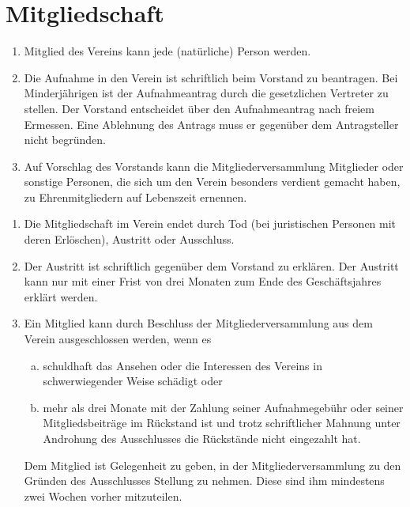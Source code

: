 \documentclass{scrartcl}
\begin{document}
\section{Mitgliedschaft}
\begin{contract}
\begin{enumerate}
    \item Mitglied des Vereins kann jede (natürliche) Person werden.
    \item Die Aufnahme in den Verein ist schriftlich beim Vorstand zu beantragen. Bei Minderjährigen ist der Aufnahmeantrag durch die gesetzlichen Vertreter zu stellen. Der Vorstand entscheidet über den Aufnahmeantrag nach freiem Ermessen. Eine Ablehnung des Antrags muss er gegenüber dem Antragsteller nicht begründen.
    \item Auf Vorschlag des Vorstands kann die Mitgliederversammlung Mitglieder oder sonstige Personen, die sich um den Verein besonders verdient gemacht haben, zu Ehrenmitgliedern auf Lebenszeit ernennen.
\end{enumerate}

\begin{enumerate}
    \item Die Mitgliedschaft im Verein endet durch Tod (bei juristischen Personen mit deren Erlöschen), Austritt oder Ausschluss.
    \item Der Austritt ist schriftlich gegenüber dem Vorstand zu erklären. Der Austritt kann nur mit einer Frist von drei Monaten zum Ende des Geschäftsjahres erklärt werden.
    \item Ein Mitglied kann durch Beschluss der Mitgliederversammlung aus dem Verein
    ausgeschlossen werden, wenn es 
    \begin{enumerate}[(a)]
        \item schuldhaft das Ansehen oder die Interessen des
        Vereins in schwerwiegender Weise schädigt oder
        \item mehr als drei Monate mit der Zahlung
        seiner Aufnahmegebühr oder seiner Mitgliedsbeiträge im Rückstand ist und trotz schriftlicher
        Mahnung unter Androhung des Ausschlusses die Rückstände nicht eingezahlt hat.
    \end{enumerate}
    Dem Mitglied ist Gelegenheit zu geben, in der Mitgliederversammlung zu den Gründen des Ausschlusses Stellung zu nehmen. Diese sind ihm mindestens zwei Wochen vorher mitzuteilen.
\end{enumerate}


\end{contract}
\end{document}
